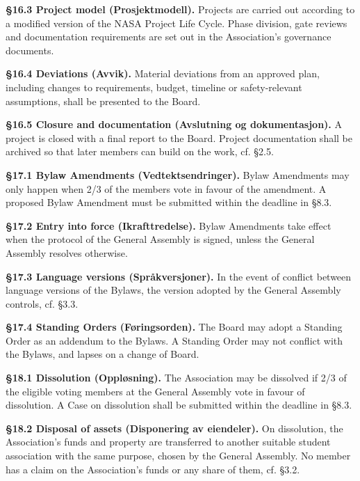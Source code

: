\documentclass{../../../Common/Latex/Templates/rapport}
\begin{document}
\textbf{\S 16.3 Project model (Prosjektmodell).} Projects are carried out according to a modified version of the NASA Project Life Cycle. Phase division, gate reviews and documentation requirements are set out in the Association's governance documents.

\textbf{\S 16.4 Deviations (Avvik).} Material deviations from an approved plan, including changes to requirements, budget, timeline or safety-relevant assumptions, shall be presented to the Board.

\textbf{\S 16.5 Closure and documentation (Avslutning og dokumentasjon).} A project is closed with a final report to the Board. Project documentation shall be archived so that later members can build on the work, cf. \S2.5.


\textbf{\S 17.1 Bylaw Amendments (Vedtektsendringer).} Bylaw Amendments may only happen when 2/3 of the members vote in favour of the amendment. A proposed Bylaw Amendment must be submitted within the deadline in \S8.3.

\textbf{\S 17.2 Entry into force (Ikrafttredelse).} Bylaw Amendments take effect when the protocol of the General Assembly is signed, unless the General Assembly resolves otherwise.

\textbf{\S 17.3 Language versions (Språkversjoner).} In the event of conflict between language versions of the Bylaws, the version adopted by the General Assembly controls, cf. \S3.3.

\textbf{\S 17.4 Standing Orders (Føringsorden).} The Board may adopt a Standing Order as an addendum to the Bylaws. A Standing Order may not conflict with the Bylaws, and lapses on a change of Board.

\textbf{\S 18.1 Dissolution (Oppløsning).} The Association may be dissolved if 2/3 of the eligible voting members at the General Assembly vote in favour of dissolution. A Case on dissolution shall be submitted within the deadline in \S8.3.

\textbf{\S 18.2 Disposal of assets (Disponering av eiendeler).} On dissolution, the Association's funds and property are transferred to another suitable student association with the same purpose, chosen by the General Assembly. No member has a claim on the Association's funds or any share of them, cf. \S3.2.
\end{document}
